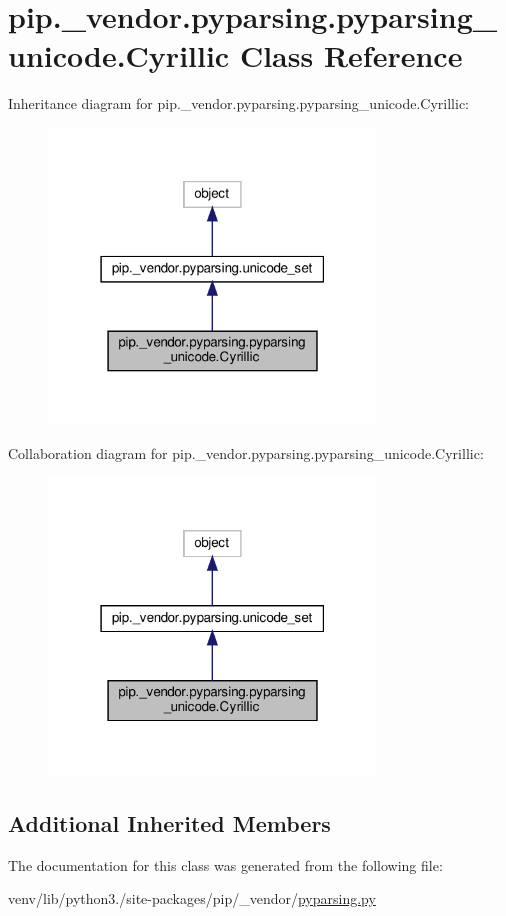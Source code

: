 \hypertarget{classpip_1_1__vendor_1_1pyparsing_1_1pyparsing__unicode_1_1Cyrillic}{}\section{pip.\+\_\+vendor.\+pyparsing.\+pyparsing\+\_\+unicode.\+Cyrillic Class Reference}
\label{classpip_1_1__vendor_1_1pyparsing_1_1pyparsing__unicode_1_1Cyrillic}


Inheritance diagram for pip.\+\_\+vendor.\+pyparsing.\+pyparsing\+\_\+unicode.\+Cyrillic\+:
\nopagebreak
\begin{figure}[H]
\begin{center}
\leavevmode
\includegraphics[width=247pt]{classpip_1_1__vendor_1_1pyparsing_1_1pyparsing__unicode_1_1Cyrillic__inherit__graph}
\end{center}
\end{figure}


Collaboration diagram for pip.\+\_\+vendor.\+pyparsing.\+pyparsing\+\_\+unicode.\+Cyrillic\+:
\nopagebreak
\begin{figure}[H]
\begin{center}
\leavevmode
\includegraphics[width=247pt]{classpip_1_1__vendor_1_1pyparsing_1_1pyparsing__unicode_1_1Cyrillic__coll__graph}
\end{center}
\end{figure}
\subsection*{Additional Inherited Members}


The documentation for this class was generated from the following file\+:\begin{DoxyCompactItemize}
\item 
venv/lib/python3./site-\/packages/pip/\+\_\+vendor/\hyperlink{pip_2__vendor_2pyparsing_8py}{pyparsing.\+py}\end{DoxyCompactItemize}
